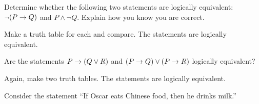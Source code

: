 \begin{questions}

\question Determine whether the following two statements are logically equivalent: $\neg(P \rightarrow Q)$ and $P \wedge \neg Q$.  Explain how you know you are correct.

  \begin{answer}
    Make a truth table for each and compare.  The statements are logically equivalent.
  \end{answer}




\question Are the statements $P \rightarrow (Q\vee R)$ and $(P \rightarrow Q) \vee (P \rightarrow R)$ logically equivalent?

  \begin{answer}
    Again, make two truth tables.  The statements are logically equivalent.
  \end{answer}




\question Consider the statement ``If Oscar eats Chinese food, then he drinks milk.''

  \begin{answer}
    \begin{parts}

\end{parts}
\end{answer}
\end{questions}

